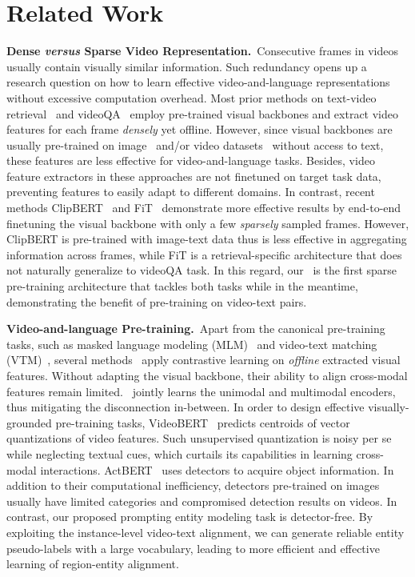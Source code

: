 \documentclass[10pt,twocolumn,letterpaper]{article}
\begin{document}
 \section{Related Work}\label{sec:relatedwork}
\noindent\textbf{Dense \emph{versus} Sparse Video Representation.}~Consecutive frames in videos usually contain visually similar information. 
Such redundancy opens up a research question on how to learn effective video-and-language representations without excessive computation overhead.
Most prior methods on text-video retrieval~\cite{xu2016msr,yu2018joint,liuuse,gabeur2020multi,patrick2021supportset} and videoQA~\cite{gao2018motion,lei2018tvqa,fan2019heterogeneous,le2020hierarchical} employ pre-trained visual backbones and extract video features for each frame \emph{densely} yet offline. However, since visual backbones are usually pre-trained on image~\cite{krizhevsky2012imagenet} and/or video datasets~\cite{kay2017kinetics} without access to text, these features are less effective for video-and-language tasks.
Besides, video feature extractors in these approaches are not finetuned on target task data, preventing features to easily adapt to different domains.
In contrast, recent methods ClipBERT~\cite{lei2021less} and FiT~\cite{Bain21} demonstrate more effective results by end-to-end finetuning the visual backbone with only a few \textit{sparsely} sampled frames.
However, ClipBERT is pre-trained with image-text data thus is less effective in aggregating information across frames, while FiT is a retrieval-specific architecture that does not naturally generalize to videoQA task.
In this regard, our \name~is the first sparse pre-training architecture that tackles both tasks while in the meantime, demonstrating the benefit of pre-training on video-text pairs.

\noindent\textbf{Video-and-language Pre-training.}~Apart from the canonical pre-training tasks, such as masked language modeling (MLM)~\cite{devlin2018bert,sun2019videobert,zhu2020actbert,luo2020univl,li2020hero,lei2021less} and video-text matching (VTM)~\cite{li2020hero,luo2020univl},
several methods~\cite{miech2020end, luo2020univl, xu2021videoclip} apply contrastive learning on \emph{offline} extracted visual features. 
Without adapting the visual backbone, their ability to align cross-modal features remain limited.
\name~jointly learns the unimodal and multimodal encoders, thus mitigating the disconnection in-between.
In order to design effective visually-grounded pre-training tasks, VideoBERT~\cite{sun2019videobert} predicts centroids of vector quantizations of video features.
Such unsupervised quantization is noisy per se while neglecting textual cues, which curtails its capabilities in learning cross-modal interactions.
ActBERT~\cite{zhu2020actbert} uses detectors to acquire object information. In addition to their computational inefficiency, detectors pre-trained on images usually have limited categories and compromised detection results on videos.
In contrast, our proposed prompting entity modeling task is detector-free.
By exploiting the instance-level video-text alignment, we can generate reliable entity pseudo-labels with a large vocabulary,
leading to more efficient and effective learning of region-entity alignment.
\end{document}
